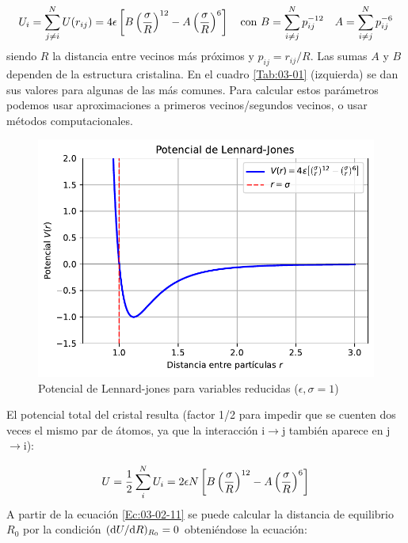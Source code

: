 \begin{equation}
    U_i = \sum_{j\neq i}^N U(r_{ij}) = 4 \epsilon \left[ B \left( \frac{\sigma}{R} \right)^{12}-A\left( \frac{\sigma}{R} \right)^6 \right] \quad \text{con} \ B = \sum_{i\neq j}^N p_{ij}^{-12} \quad A = \sum_{i\neq j}^N p_{ij}^{-6} 
\end{equation}
siendo $R$ la distancia entre vecinos más próximos y $p_{ij}=r_{ij}/R$. Las sumas $A$ y $B$ dependen de la estructura cristalina. En el cuadro \ref{Tab:03-01} (izquierda) se dan sus valores para algunas de las más comunes. Para calcular estos parámetros podemos usar aproximaciones a primeros vecinos/segundos vecinos, o usar métodos computacionales. 

\begin{figure}[h!] \centering
    \includegraphics[scale=0.95]{Cuerpo/Ch_03/Lennard-jones.pdf}
    \caption{Potencial de Lennard-jones para variables reducidas ($\epsilon,\sigma = 1$)}
    \label{Fig:03-03}
\end{figure}    

El potencial total del cristal resulta (factor 1/2 para impedir que se cuenten dos veces el mismo par de átomos, ya que la interacción i$\rightarrow$j también aparece en j$\rightarrow$i):

\begin{equation}
    U = \frac{1}{2} \sum_i^N U_i = 2 \epsilon N \left[ B\left( \frac{\sigma}{R} \right)^{12}-A\left( \frac{\sigma}{R} \right)^6 \right] \label{Ec:03-02-11}
\end{equation}
A partir de la ecuación \ref{Ec:03-02-11} se puede calcular la distancia de equilibrio $R_0$ por la condición $(\mathrm{d} U / \mathrm{d} R)_{R_0} =0$ obteniéndose la ecuación:

